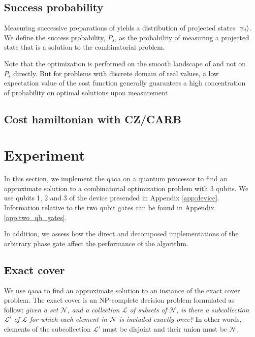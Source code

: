 \subsection{Success probability}
Measuring successive preparations of \optimalstate yields a distribution of projected states $\ket{\psi_i}$.
We define the success probability, $P_s$, as the probability of measuring a projected state that is a solution to the combinatorial problem. 

Note that the optimization is performed on the smooth landscape of \cost{} and not on $P_s$ directly. But for problems with discrete domain of real values, a low expectation value of the cost function generally guarantees a high concentration of probability on optimal solutions upon measurement \cite{Cook2019TheCover, Wang2019XY-mixers:QAOA}.

\subsection{Cost hamiltonian with CZ/CARB}



\section{Experiment}
In this section, we implement the \gls{qaoa} on a quantum processor to find an approximate solution to a combinatorial optimization problem with 3 qubits. We use qubits 1, 2 and 3 of the device presended in Appendix \ref{app:device}. Information relative to the two qubit gates can be found in Appendix \ref{app:two_qb_gates}.

In addition, we assess how the direct and decomposed implementations of the arbitrary phase gate affect the performance of the algorithm. 

\subsection{Exact cover}
We use \gls{qaoa} to find an approximate solution to an instance of the exact cover problem. The exact cover \cite{Karp1972ReducibilityProblems} is an NP-complete \cite{GareyM1990} decision problem formulated as follow: \textit{given a set $\mathcal{N}$, and a collection $\mathcal{L}$ of subsets of $\mathcal{N}$, is there a subcollection $\mathcal{L}'$ of $\mathcal{L}$ for which each element in $\mathcal{N}$ is included exactly once?} In other words, elements of the subcollection $\mathcal{L}'$ must be disjoint and their union must be $\mathcal{N}$.

